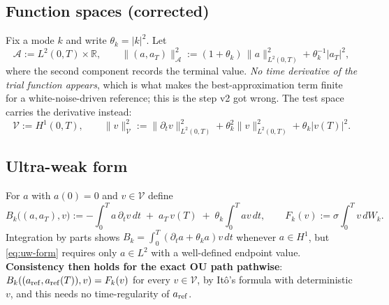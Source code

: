 %
%
%

\subsection{Function spaces (corrected)}

Fix a mode $k$ and write $\theta_k = |k|^2$. Let
\[
  \mathcal{A} := L^2(0,T) \times \mathbb{R},
  \qquad
  \|(a, a_T)\|_{\mathcal{A}}^2
    := (1 + \theta_k)\,\|a\|_{L^2(0,T)}^2 + \theta_k^{-1} |a_T|^2 ,
\]
where the second component records the terminal value. \emph{No time
derivative of the trial function appears}, which is what makes the
best-approximation term finite for a white-noise-driven reference; this is
the step v2 got wrong. The test space carries the derivative instead:
\[
  \mathcal{V} := H^1(0,T),
  \qquad
  \|v\|_{\mathcal{V}}^2
    := \|\partial_t v\|_{L^2(0,T)}^2 + \theta_k^2 \|v\|_{L^2(0,T)}^2 + \theta_k |v(T)|^2 .
\]

\subsection{Ultra-weak form}

For $a$ with $a(0) = 0$ and $v \in \mathcal{V}$ define
\begin{equation}
  B_k\bigl((a, a_T), v\bigr)
    := -\int_0^T a\,\partial_t v \,dt \;+\; a_T\,v(T) \;+\; \theta_k \int_0^T a v \,dt,
  \qquad
  F_k(v) := \sigma \int_0^T v \, dW_k .
  \label{eq:uw-form}
\end{equation}
Integration by parts shows $B_k = \int_0^T (\partial_t a + \theta_k a) v\,dt$
whenever $a \in H^1$, but \eqref{eq:uw-form} requires only $a \in L^2$ with a
well-defined endpoint value. \textbf{Consistency then holds for the exact OU
path pathwise}: $B_k((a_{\rm ref}, a_{\rm ref}(T)), v) = F_k(v)$ for every
$v \in \mathcal{V}$, by It\^o's formula with deterministic $v$, and this needs
no time-regularity of $a_{\rm ref}$.

